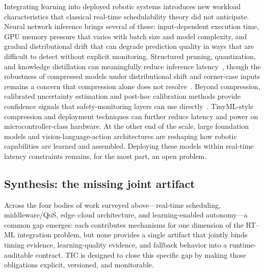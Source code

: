 \documentclass[smallextended]{svjour3}
\begin{document}
Integrating learning into deployed robotic systems introduces new workload characteristics that classical real-time schedulability theory did not anticipate. Neural network inference brings several of these: input-dependent execution time, GPU memory pressure that varies with batch size and model complexity, and gradual distributional drift that can degrade prediction quality in ways that are difficult to detect without explicit monitoring. Structured pruning, quantization, and knowledge distillation can meaningfully reduce inference latency~\cite{sze2017}, though the robustness of compressed models under distributional shift and corner-case inputs remains a concern that compression alone does not resolve~\cite{brunke2022,seshia2022}. Beyond compression, calibrated uncertainty estimation and post-hoc calibration methods provide confidence signals that safety-monitoring layers can use directly~\cite{gal2016dropout,guo2017calibration}. TinyML-style compression and deployment techniques can further reduce latency and power on microcontroller-class hardware.
At the other end of the scale, large foundation models and vision-language-action architectures are reshaping how robotic capabilities are learned and assembled. Deploying these models within real-time latency constraints remains, for the most part, an open problem.

\subsection{Synthesis: the missing joint artifact}
\label{subsec:synthesis_gap}
Across the four bodies of work surveyed above---real-time scheduling, middleware/QoS, edge--cloud architecture, and learning-enabled autonomy---a common gap emerges: each contributes mechanisms for one dimension of the RT--ML integration problem, but none provides a single artifact that jointly binds timing evidence, learning-quality evidence, and fallback behavior into a runtime-auditable contract. TIC is designed to close this specific gap by making those obligations explicit, versioned, and monitorable.
\end{document}

